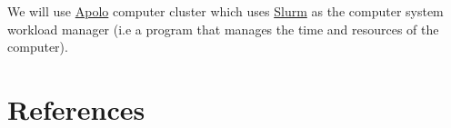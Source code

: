 \documentclass[
  letterpaper,
]{scrbook}
\newlength{\cslhangindent}
\newlength{\cslentryspacingunit} %
\newenvironment{CSLReferences}[2] %
 {%
  \setlength{\parindent}{0pt}
  \ifodd #1
  \let\oldpar\par
  \def\par{\hangindent=\cslhangindent\oldpar}
  \fi
  \setlength{\parskip}{#2\cslentryspacingunit}
 }%
 {}
\begin{document}
We will use \href{}{Apolo} computer cluster which uses \href{}{Slurm} as
the computer system workload manager (i.e a program that manages the
time and resources of the computer).

\hypertarget{references}{%
\chapter*{References}\label{references}}

\hypertarget{refs}{}
\begin{CSLReferences}{0}{0}
\end{CSLReferences}

\backmatter
\end{document}
